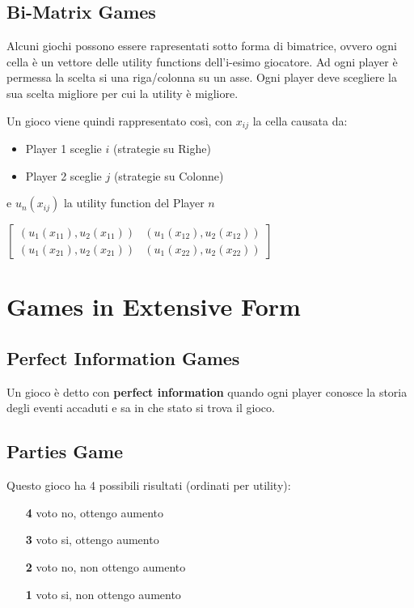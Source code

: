 \documentclass[10pt,a4paper]{report}
\begin{document}
        \section{Bi-Matrix Games}
        Alcuni giochi possono essere rapresentati sotto forma di bimatrice, ovvero ogni cella è un vettore delle utility functions dell'i-esimo giocatore.
        Ad ogni player è permessa la scelta si una riga/colonna su un asse. Ogni player deve scegliere la sua scelta migliore per cui la utility è migliore.
        
        Un gioco viene quindi rappresentato così, con $x_{ij}$ la cella causata da:
        \begin{itemize}
            \item Player 1 sceglie $i$ (strategie su Righe)
            \item Player 2 sceglie $j$ (strategie su Colonne)
        \end{itemize}
        e $u_n(x_{ij})$ la utility function del Player $n$
        \begin{center} 
        $
        \begin{bmatrix}
            (u_{1}(x_{11}),u_{2}(x_{11})) & (u_{1}(x_{12}),u_{2}(x_{12})) \\
            (u_{1}(x_{21}),u_{2}(x_{21})) & (u_{1}(x_{22}),u_{2}(x_{22})) 
        \end{bmatrix}
        $
        \end{center}
    \chapter{Games in Extensive Form}
        \section{Perfect Information Games}
        Un gioco è detto con \textbf{perfect information} quando ogni player conosce la storia degli eventi accaduti e sa in che stato si trova il gioco.
        
        \section{Parties Game}
        Questo gioco ha 4 possibili risultati (ordinati per utility):
        \begin{itemize}
            \item[\textbf{4}] voto no, ottengo aumento
            \item[\textbf{3}] voto si, ottengo aumento
            \item[\textbf{2}] voto no, non ottengo aumento
            \item[\textbf{1}] voto si, non ottengo aumento   
        \end{itemize}
\end{document}
